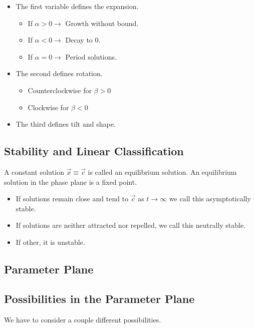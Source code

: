         \begin{itemize}
            \item The first variable defines the expansion.
                \begin{itemize}
                    \item If $\alpha > 0 \to$ Growth without bound.
                    \item If $\alpha < 0 \to$ Decay to $0$.
                    \item If $\alpha = 0 \to$ Period solutions.
                \end{itemize}
            \item The second defines rotation.
                \begin{itemize}
                    \item Counterclockwise for $\beta > 0$
                    \item Clockwise for $\beta < 0$
                \end{itemize}
            \item The third defines tilt and shape.
        \end{itemize}

    \subsection{Stability and Linear Classification}
    A constant solution $\vec{x} \equiv \vec{c}$ is called an equilibrium solution. An equilibrium solution in the phase plane is a fixed point.

        \begin{itemize}
            \item If solutions remain close and tend to $\vec{c}$ as $t \to \infty$ we call this asymptotically stable.
            \item If solutions are neither attracted nor repelled, we call this neutrally stable.
            \item If other, it is unstable.
        \end{itemize}

    \subsection{Parameter Plane}

    \subsection{Possibilities in the Parameter Plane}
    We have to consider a couple different possibilities.

